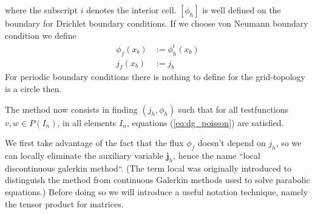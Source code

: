 \documentclass[a4paper,12pt]{scrartcl}
\renewcommand{\vec}[1]{{\mathbf{#1}}}
\begin{document}
where the subscript $i$ denotes the interior cell. $[\phi_h]$ is well
defined on the boundary for Drichlet boundary conditions. If we 
choose von Neumann boundary condition we define
\begin{subequations}
    \begin{align}
        \phi_f(x_b) &:= \phi^i_h(x_b) \\
        j_f(x_b) &:= j_b
        \label{eq:dg_neumann_boundary_fluxes}
    \end{align}
\end{subequations}
For periodic boundary conditions there is nothing to define for 
the grid-topology is a circle then. 

The method now consists in finding $(j_h, \phi_h)$ such that for all 
testfunctions $v, w\in P(I_n)$, in all elements $I_n$, equations 
(\ref{eq:dg_poisson}) are satisfied.

We first take advantage of the fact that the flux $\phi_f$ doesn't 
depend on $j_h$, so we can locally eliminate the auxiliary 
variable $\vec j_h$, hence the name ``local discontinuous galerkin method``.
(The term local was originally introduced to distinguish the 
method from continuous Galerkin methods used to solve parabolic equations.)
Before doing so we will introduce a useful notation technique, namely the
tensor product for matrices.
 
\end{document}
